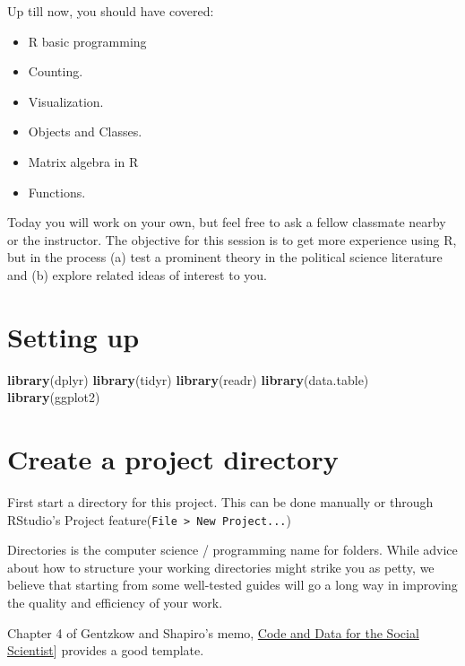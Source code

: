 \documentclass[]{book}
\newenvironment{Shaded}{\begin{snugshade}}{\end{snugshade}}
\newcommand{\KeywordTok}[1]{\textcolor[rgb]{0.13,0.29,0.53}{\textbf{#1}}}
\newcommand{\NormalTok}[1]{#1}
\providecommand{\tightlist}{%
  \setlength{\itemsep}{0pt}\setlength{\parskip}{0pt}}
\theoremstyle{definition}
\theoremstyle{definition}
\theoremstyle{definition}
\theoremstyle{remark}
\begin{document}
\begin{Shaded}
\begin{Highlighting}[]
\begin{Shaded}
\begin{Highlighting}[]
\begin{Shaded}
\begin{Highlighting}[]
Up till now, you should have covered:

\begin{itemize}
\tightlist
\item
  R basic programming
\item
  Counting.
\item
  Visualization.
\item
  Objects and Classes.
\item
  Matrix algebra in R
\item
  Functions.
\end{itemize}

Today you will work on your own, but feel free to ask a fellow classmate nearby or the instructor. The objective for this session is to get more experience using R, but in the process (a) test a prominent theory in the political science literature and (b) explore related ideas of interest to you.

\hypertarget{setting-up}{%
\section{Setting up}\label{setting-up}}

\begin{Shaded}
\begin{Highlighting}[]
\KeywordTok{library}\NormalTok{(dplyr)}
\KeywordTok{library}\NormalTok{(tidyr)}
\KeywordTok{library}\NormalTok{(readr)}
\KeywordTok{library}\NormalTok{(data.table)}
\KeywordTok{library}\NormalTok{(ggplot2)}
\end{Highlighting}
\end{Shaded}

\hypertarget{create-a-project-directory}{%
\section{Create a project directory}\label{create-a-project-directory}}

First start a directory for this project. This can be done manually or through RStudio's Project feature(\texttt{File\ \textgreater{}\ New\ Project...})

Directories is the computer science / programming name for folders. While advice about how to structure your working directories might strike you as petty, we believe that starting from some well-tested guides will go a long way in improving the quality and efficiency of your work.

Chapter 4 of Gentzkow and Shapiro's memo, \href{https://web.stanford.edu/~gentzkow/research/CodeAndData.pdf}{Code and Data for the Social Scientist}{]} provides a good template.


\end{Highlighting}
\end{Shaded}
\end{Highlighting}
\end{Shaded}
\end{Highlighting}
\end{Shaded}
\end{document}

